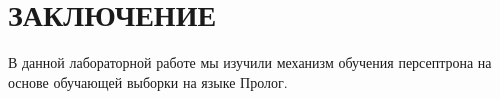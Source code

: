 \section*{ЗАКЛЮЧЕНИЕ}

В данной лабораторной работе мы изучили механизм обучения
персептрона на основе обучающей выборки на языке Пролог.

\newpage
